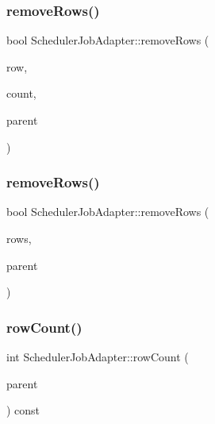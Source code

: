 \mbox{\label{class_scheduler_job_adapter_a35e97746b55b5412f90fd27e4fe991dd}} 
\subsubsection{\texorpdfstring{removeRows()}{removeRows()}\hspace{0.1cm}{\footnotesize\ttfamily [1/2]}}
{\footnotesize\ttfamily bool Scheduler\+Job\+Adapter\+::remove\+Rows (\begin{DoxyParamCaption}\item[{int}]{row,  }\item[{int}]{count,  }\item[{const Q\+Model\+Index \&}]{parent }\end{DoxyParamCaption})\hspace{0.3cm}{\ttfamily [override]}}

\mbox{\label{class_scheduler_job_adapter_a5582b5b18f57718c186f01dbdc8fed79}} 
\subsubsection{\texorpdfstring{removeRows()}{removeRows()}\hspace{0.1cm}{\footnotesize\ttfamily [2/2]}}
{\footnotesize\ttfamily bool Scheduler\+Job\+Adapter\+::remove\+Rows (\begin{DoxyParamCaption}\item[{std\+::vector$<$ int $>$}]{rows,  }\item[{const Q\+Model\+Index \&}]{parent }\end{DoxyParamCaption})}

\mbox{\label{class_scheduler_job_adapter_a68ded1742c1fabad7bf1a635f401b355}} 
\subsubsection{\texorpdfstring{rowCount()}{rowCount()}}
{\footnotesize\ttfamily int Scheduler\+Job\+Adapter\+::row\+Count (\begin{DoxyParamCaption}\item[{const Q\+Model\+Index \&}]{parent }\end{DoxyParamCaption}) const\hspace{0.3cm}{\ttfamily [override]}}

